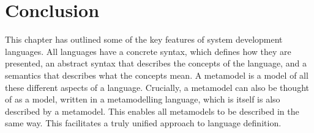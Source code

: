 \section{Conclusion}

This chapter has outlined some of the key features of system
development languages. All languages have a concrete syntax, which
defines how they are presented, an abstract syntax that describes
the concepts of the language, and a semantics that describes what
the concepts mean. A metamodel is a model of all these different
aspects of a language. Crucially, a metamodel can also be thought
of as a model, written in a metamodelling language, which is
itself is also described by a metamodel. This enables all
metamodels to be described in the same way. This facilitates a
truly unified approach to language definition.
